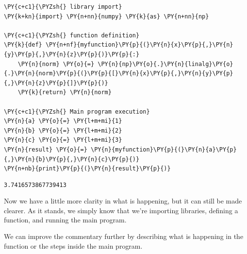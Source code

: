     \begin{tcolorbox}[breakable, size=fbox, boxrule=1pt, pad at break*=1mm,colback=cellbackground, colframe=cellborder]
\begin{Verbatim}[commandchars=\\\{\}]
\PY{c+c1}{\PYZsh{} library import}
\PY{k+kn}{import} \PY{n+nn}{numpy} \PY{k}{as} \PY{n+nn}{np}

\PY{c+c1}{\PYZsh{} function definition}
\PY{k}{def} \PY{n+nf}{myfunction}\PY{p}{(}\PY{n}{x}\PY{p}{,}\PY{n}{y}\PY{p}{,}\PY{n}{z}\PY{p}{)}\PY{p}{:}
    \PY{n}{norm} \PY{o}{=} \PY{n}{np}\PY{o}{.}\PY{n}{linalg}\PY{o}{.}\PY{n}{norm}\PY{p}{(}\PY{p}{[}\PY{n}{x}\PY{p}{,}\PY{n}{y}\PY{p}{,}\PY{n}{z}\PY{p}{]}\PY{p}{)}
    \PY{k}{return} \PY{n}{norm}

\PY{c+c1}{\PYZsh{} Main program execution}
\PY{n}{a} \PY{o}{=} \PY{l+m+mi}{1}
\PY{n}{b} \PY{o}{=} \PY{l+m+mi}{2}
\PY{n}{c} \PY{o}{=} \PY{l+m+mi}{3}
\PY{n}{result} \PY{o}{=} \PY{n}{myfunction}\PY{p}{(}\PY{n}{a}\PY{p}{,}\PY{n}{b}\PY{p}{,}\PY{n}{c}\PY{p}{)}
\PY{n+nb}{print}\PY{p}{(}\PY{n}{result}\PY{p}{)}
\end{Verbatim}
\end{tcolorbox}

    \begin{Verbatim}[commandchars=\\\{\}]
3.7416573867739413
    \end{Verbatim}

    Now we have a little more clarity in what is happening, but it can still
be made clearer. As it stands, we simply know that we're importing
libraries, defining a function, and running the main program.

We can improve the commentary further by describing what is happening in
the function or the steps inside the main program.

